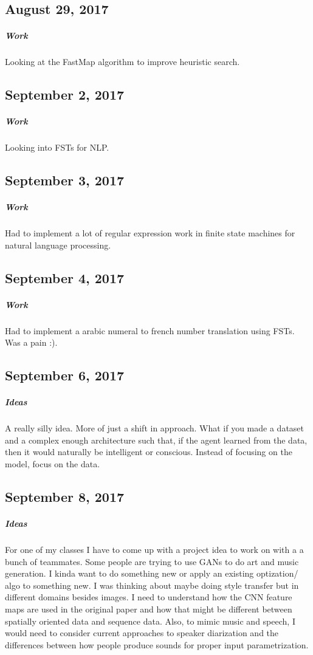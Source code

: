 \documentclass[a4paper]{article}
\begin{document}
\subsection{August 29, 2017}
\subparagraph{Work}
Looking at the FastMap algorithm to improve heuristic search.

\subsection{September 2, 2017}
\subparagraph{Work}
Looking into FSTs for NLP.

\subsection{September 3, 2017}
\subparagraph{Work}
Had to implement a lot of regular expression work in finite state machines for natural language processing.

\subsection{September 4, 2017}
\subparagraph{Work}
Had to implement a arabic numeral to french number translation using FSTs. Was a pain :).

\subsection{September 6, 2017}
\subparagraph{Ideas}
A really silly idea. More of just a shift in approach. What if you made a dataset and a complex enough architecture such that, if the agent learned from the data, then it would naturally be intelligent or conscious. Instead of focusing on the model, focus on the data.

\subsection{September 8, 2017}
\subparagraph{Ideas}
For one of my classes I have to come up with a project idea to work on with a a bunch of teammates. Some people are trying to use GANs to do art and music generation. I kinda want to do something new or apply an existing optization/ algo to something new. I was thinking about maybe doing style transfer but in different domains besides images. I need to understand how the CNN feature maps are used in the original paper and how that might be different between spatially oriented data and sequence data. Also, to mimic music and speech, I would need to consider current approaches to speaker diarization and the differences between how people produce sounds for proper input parametrization.
\end{document}
